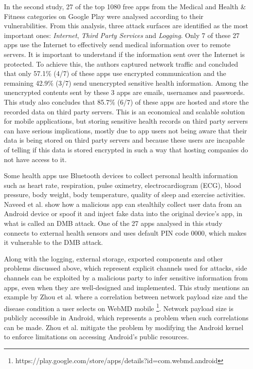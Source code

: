In the second study, 27 of the top 1080 free apps from the Medical and Health \& Fitness categories on Google Play were analysed according to their vulnerabilities. From this analysis, three attack surfaces are identified as the most important ones: \emph{Internet}, \emph{Third Party Services} and \emph{Logging}. Only 7 of these 27 apps use the Internet to effectively send medical information over to remote servers. It is important to understand if the information sent over the Internet is protected. To achieve this, the authors captured network traffic and concluded that only 57.1\% (4/7) of these apps use encrypted communication and the remaining 42.9\% (3/7) send unencrypted sensitive health information. Among the unencrypted contents sent by these 3 apps are emails, usernames and passwords. This study also concludes that 85.7\% (6/7) of these apps are hosted and store the recorded data on third party servers. This is an economical and scalable solution for mobile applications, but storing sensitive health records on third party servers can have serious implications, mostly due to app users not being aware that their data is being stored on third party servers and because these users are incapable of telling if this data is stored encrypted in such a way that hosting companies do not have access to it.

Some health apps use Bluetooth devices to collect personal health information such as heart rate, respiration, pulse oximetry, electrocardiogram (ECG), blood pressure, body weight, body temperature, quality of sleep and exercise activities. Naveed et al. \cite{naveed2014inside} show how a malicious app can stealthily collect user data from an Android device or spoof it and inject fake data into the original device's app, in what is called an \ac{DMB} attack. One of the 27 apps analysed in this study connects to external health sensors and uses default PIN code 0000, which makes it vulnerable to the \ac{DMB} attack.

Along with the logging, external storage, exported components and other problems discussed above, which represent explicit channels used for attacks, side channels can be exploited by a malicious party to infer sensitive information from apps, even when they are well-designed and implemented. This study mentions an example by Zhou et al. \cite{zhou2013identity} where a correlation between network payload size and the disease condition a user selects on WebMD mobile \footnote{https://play.google.com/store/apps/details?id=com.webmd.android}. Network payload size is publicly accessible in Android, which represents a problem when such correlations can be made. Zhou et al. \cite{zhou2013identity} mitigate the problem by modifying the Android kernel to enforce limitations on accessing Android's public resources. 

